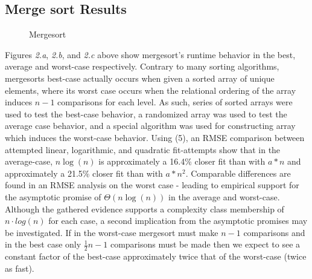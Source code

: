 \documentclass[11pt,letterpaper]{report}
\begin{document}
\subsection*{Merge sort Results}
\begin{figure}[h]
  \centering
  \hfill
  \hfill
  \caption{Mergesort}
\end{figure}

Figures \emph{2.a}, \emph{2.b}, and \emph{2.c} above show mergesort's runtime behavior in the best, average and worst-case respectively. Contrary to many sorting algorithms, mergesorts best-case actually occurs when given a sorted array of unique elements, where its worst case occurs when the relational ordering of the array induces $n-1$ comparisons for each level. As such, series of sorted arrays were used to test the best-case behavior, a randomized array was used to test the average case behavior, and a special algorithm was used for constructing array which induces the worst-case behavior.
Using (5), an RMSE comparison between attempted linear, logarithmic, and quadratic fit-attempts show that in the average-case, $n\log{}(n)$ is approximately a 16.4\% closer fit than with $a*n$ and approximately a 21.5\% closer fit than with $a*n^2$. Comparable differences are found in an RMSE analysis on the worst case - leading to empirical support for the asymptotic promise of $\Theta(n\log{}(n))$ in the average and worst-case.
Although the gathered evidence supports a complexity class membership of $n \cdot log{}(n)$ for each case, a second implication from the asymptotic promises may be investigated. If in the worst-case mergesort must make $n-1$ comparisons and in the best case only $\frac{1}{2}n-1$ comparisons must be made then we expect to see a constant factor of the best-case approximately twice that of the worst-case (twice as fast). 
\end{document}
